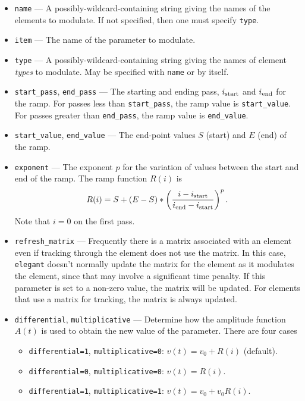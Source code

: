 \documentclass[11pt]{article}
\begin{document}
\begin{itemize}
\item \verb|name| --- A possibly-wildcard-containing string giving the names of the
        elements to modulate. If not specified, then one must specify \verb|type|.
\item \verb|item| --- The name of the parameter to modulate.
\item \verb|type| --- A possibly-wildcard-containing string giving the names of element
        {\em types} to modulate.  May be specified with \verb|name| or by itself.
\item \verb|start_pass|, \verb|end_pass| --- The starting and ending pass, 
  $i_{\rm start}$ and $i_{\rm end}$ for the ramp.
 For passes less than \verb|start_pass|, the ramp value is \verb|start_value|.
 For passes greater than \verb|end_pass|, the ramp value is \verb|end_value|.
\item \verb|start_value|, \verb|end_value| --- The end-point values $S$ (start) and $E$ (end) of the ramp.
\item \verb|exponent| --- The exponent $p$ for the variation of values between the start and end
  of the ramp.  The ramp function $R(i)$ is 
\begin{equation}
  R(i) = S + (E-S)*\left(\frac{i-i_{\rm start}}{i_{\rm end}-i_{\rm start}}\right)^p.
\end{equation}
Note that $i=0$ on the first pass.
\item \verb|refresh_matrix| --- Frequently there is a matrix associated with an element even
  if tracking through the element does not use the matrix.  In this case, {\tt elegant} doesn't
  normally update the matrix for the element as it modulates the element, since that may involve
  a significant time penalty.  If this parameter is set to a non-zero value, the matrix will
  be updated.  For elements that use a matrix for tracking, the matrix is always updated.
\item \verb|differential|, \verb|multiplicative| --- Determine how the amplitude function
  $A(t)$ is used to obtain the new value of the parameter.  There are four cases
  \begin{itemize}
    \item \verb|differential=1|, \verb|multiplicative=0|: $v(t) = v_0 + R(i)$ (default).
    \item \verb|differential=0|, \verb|multiplicative=0|: $v(t) = R(i)$.  
    \item \verb|differential=1|, \verb|multiplicative=1|: $v(t) = v_0 + v_0 R(i)$.  

\end{itemize}
\end{itemize}
\end{document}
